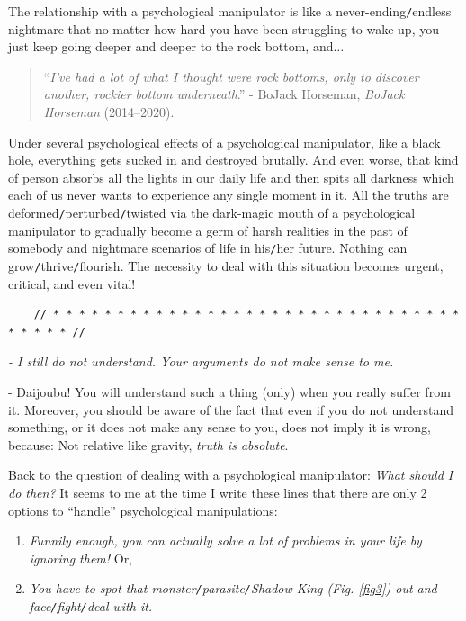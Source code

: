 \documentclass[12pt]{article}
\numberwithin{equation}{section}
\begin{document}
The relationship with a psychological manipulator is like a never-ending\texttt{/}endless nightmare that no matter how hard you have been struggling to wake up, you just keep going deeper and deeper to the rock bottom, and$\ldots$
\begin{quotation}
    ``\textit{I've had a lot of what I thought were rock bottoms, only to discover another, rockier bottom underneath}.'' - BoJack Horseman, \textit{BoJack Horseman} (2014--2020).
\end{quotation}
Under several psychological effects of a psychological manipulator, like a black hole, everything gets sucked in and destroyed brutally. And even worse, that kind of person absorbs all the lights in our daily life and then spits all darkness which each of us never wants to experience any single moment in it. All the truths are deformed\texttt{/}perturbed\texttt{/}twisted via the dark-magic mouth of a psychological manipulator to gradually become a germ of harsh realities in the past of somebody and nightmare scenarios of life in his\texttt{/}her future. Nothing can grow\texttt{/}thrive\texttt{/}flourish. The necessity to deal with this situation becomes urgent, critical, and even vital!

\begin{verbatim}
    // * * * * * * * * * * * * * * * * * * * * * * * * * * * * * * * * * * * * * //
\end{verbatim}

\noindent
{} \textit{- I still do not understand. Your arguments do not make sense to me.}

- Daijoubu! You will understand such a thing (only) when you really suffer from it. Moreover, you should be aware of the fact that even if you do not understand something, or it does not make any sense to you, does not imply it is wrong, because: Not relative like gravity, \textit{truth is absolute}.

Back to the question of dealing with a psychological manipulator: \textit{What should I do then?} It seems to me at the time I write these lines that there are only 2 options to ``handle'' psychological manipulations:
\begin{enumerate}
    \item \textit{Funnily enough, you can actually solve a lot of problems in your life by ignoring them!} Or,
    \item \textit{You have to spot that monster\texttt{/}parasite\texttt{/}Shadow King (Fig. \ref{fig3}) out and face\texttt{/}fight\texttt{/}deal with it.}
\end{enumerate}
\end{document}
